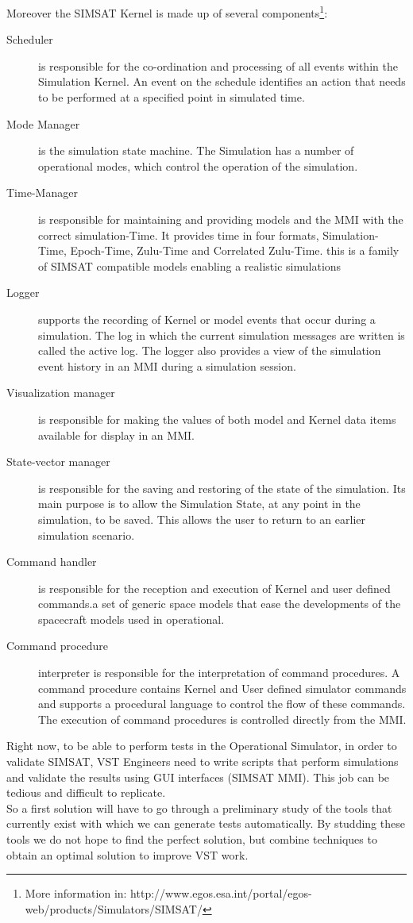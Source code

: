 \documentclass[a4paper,UKenglish]{oasics}
\begin{document}
Moreover the SIMSAT Kernel is made up of several components\footnote{More information in: http://www.egos.esa.int/portal/egos-web/products/Simulators/SIMSAT/}:
\begin{description}
\item[Scheduler] is responsible for the co-ordination and processing of all events within the Simulation Kernel. An event on the schedule identifies an action that needs to be performed at a specified point in simulated time.
\item[Mode Manager] is the simulation state machine. The Simulation has a number of operational modes, which control the operation of the simulation.
\item[Time-Manager] is responsible for maintaining and providing models and the MMI with the correct simulation-Time. It provides time in four formats, Simulation-Time, Epoch-Time, Zulu-Time and Correlated Zulu-Time. this is a family of SIMSAT compatible models enabling a realistic simulations
\item[Logger] supports the recording of Kernel or model events that occur during a simulation. The log in which the current simulation messages are written is called the active log. The logger also provides a view of the simulation event history in an MMI during a simulation session.
\item[Visualization manager] is responsible for making the values of both model and Kernel data items available for display in an MMI.
\item[State-vector manager] is responsible for the saving and restoring of the state of the simulation. Its main purpose is to allow the Simulation State, at any point in the simulation, to be saved. This allows the user to return to an earlier simulation scenario.
\item[Command handler] is responsible for the reception and execution of Kernel and user defined commands.a set of generic space models that ease the developments of the spacecraft models used in operational.
\item[Command procedure] interpreter is responsible for the interpretation of command procedures. A command procedure contains Kernel and User defined simulator commands and supports a procedural language to control the flow of these commands. The execution of command procedures is controlled directly from the MMI.
\end{description}

Right now, to be able to perform tests in the Operational Simulator, in order to validate SIMSAT, VST Engineers need to write scripts that
perform simulations and validate the results using GUI interfaces (SIMSAT MMI). This job can be tedious and difficult to replicate.\\
So a first solution will have to go through a preliminary study of the tools
that currently exist with which we can generate tests automatically.
By studding these tools we do not hope to find the perfect solution, but combine techniques to obtain an optimal solution to improve VST work.
\end{document}
